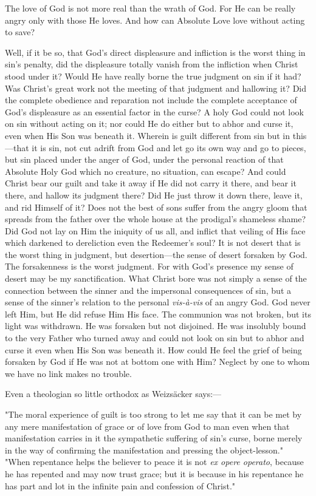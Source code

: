 \documentclass[12pt,a5paper,twoside,titlepage]{book}
\begin{document}
The love of God is not more real than the wrath of God. 
For He can be really angry only with those He loves. 
And how can Absolute Love love without acting to save? 

Well, if it be so, that God's direct displeasure and 
infliction is the worst thing in sin's penalty, did the displeasure 
totally vanish from the infliction when Christ 
stood under it? Would He have really borne the true 
judgment on sin if it had? Was Christ's great work not 
the meeting of that judgment and hallowing it? Did 
the complete obedience and reparation not include the 
complete acceptance of God's displeasure as an essential 
factor in the curse? A holy God could not look on sin 
without acting on it; nor could He do either but to abhor 
and curse it, even when His Son was beneath it. Wherein 
is guilt different from sin but in this---that it is sin, not 
cut adrift from God and let go its own way and go to 
pieces, but sin placed under the anger of God, under the 
personal reaction of that Absolute Holy God which no 
creature, no situation, can escape? And could Christ bear 
our guilt and take it away if He did not carry it there, and 
bear it there, and hallow its judgment there? Did He 
just throw it down there, leave it, and rid Himself of it? 
Does not the best of sons suffer from the angry gloom that 
spreads from the father over the whole house at the 
prodigal's shameless shame? Did God not lay on Him the 
iniquity of us all, and inflict that veiling of His face which 
darkened to dereliction even the Redeemer's soul? It is 
not desert that is the worst thing in judgment, but desertion---the 
sense of desert forsaken by God. The forsakenness 
is the worst judgment. For with God's presence 
my sense of desert may be my sanctification. What 
Christ bore was not simply a sense of the connection 
between the sinner and the impersonal consequences of 
sin, but a sense of the sinner's relation to the personal 
\textit{vis-\`{a}-vis} of an angry God. God never left Him, but He 
did refuse Him His face. The communion was not broken, 
but its light was withdrawn. He was forsaken but not 
disjoined. He was insolubly bound to the very Father 
who turned away and could not look on sin but to abhor 
and curse it even when His Son was beneath it. How 
could He feel the grief of being forsaken by God if He 
was not at bottom one with Him? Neglect by one to 
whom we have no link makes no trouble. 

Even a theologian so little orthodox as Weizs\"{a}cker 
says:---

"The moral experience of guilt is too strong to let me 
say that it can be met by any mere manifestation of grace 
or of love from God to man even when that manifestation 
carries in it the sympathetic suffering of sin's curse, borne 
merely in the way of confirming the manifestation and 
pressing the object-lesson." "When repentance helps the 
believer to peace it is not \textit{ex opere operato}, because he has 
repented and may now trust grace; but it is because in 
his repentance he has part and lot in the infinite pain and 
confession of Christ." 
\end{document}
